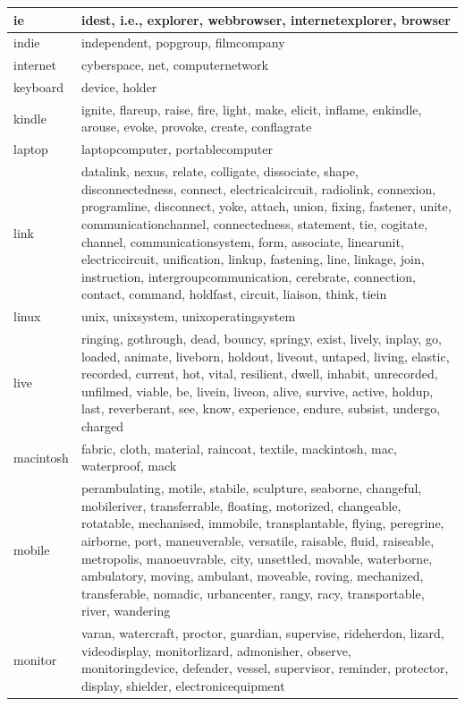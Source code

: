 \documentclass[12pt,a4paper]{report}
\begin{document}
\begin{table}[H]
\begin{center}
\begin{tabular}{|l|l|}
ie & idest, i.e., explorer, webbrowser, internetexplorer, browser\\
\hline
indie & independent, popgroup, filmcompany\\
\hline
internet & cyberspace, net, computernetwork\\
\hline
keyboard & device, holder\\
\hline
kindle & ignite, flareup, raise, fire, light, make, elicit, inflame, enkindle, arouse, evoke, provoke, create, conflagrate\\
\hline
laptop & laptopcomputer, portablecomputer\\
\hline
link & datalink, nexus, relate, colligate, dissociate, shape, disconnectedness, connect, electricalcircuit, radiolink, connexion, programline, disconnect, yoke, attach, union, fixing, fastener, unite, communicationchannel, connectedness, statement, tie, cogitate, channel, communicationsystem, form, associate, linearunit, electriccircuit, unification, linkup, fastening, line, linkage, join, instruction, intergroupcommunication, cerebrate, connection, contact, command, holdfast, circuit, liaison, think, tiein\\
\hline
linux & unix, unixsystem, unixoperatingsystem\\
\hline
live & ringing, gothrough, dead, bouncy, springy, exist, lively, inplay, go, loaded, animate, liveborn, holdout, liveout, untaped, living, elastic, recorded, current, hot, vital, resilient, dwell, inhabit, unrecorded, unfilmed, viable, be, livein, liveon, alive, survive, active, holdup, last, reverberant, see, know, experience, endure, subsist, undergo, charged\\
\hline
macintosh & fabric, cloth, material, raincoat, textile, mackintosh, mac, waterproof, mack\\
\hline
mobile & perambulating, motile, stabile, sculpture, seaborne, changeful, mobileriver, transferrable, floating, motorized, changeable, rotatable, mechanised, immobile, transplantable, flying, peregrine, airborne, port, maneuverable, versatile, raisable, fluid, raiseable, metropolis, manoeuvrable, city, unsettled, movable, waterborne, ambulatory, moving, ambulant, moveable, roving, mechanized, transferable, nomadic, urbancenter, rangy, racy, transportable, river, wandering\\
\hline
monitor & varan, watercraft, proctor, guardian, supervise, rideherdon, lizard, videodisplay, monitorlizard, admonisher, observe, monitoringdevice, defender, vessel, supervisor, reminder, protector, display, shielder, electronicequipment\\

\end{tabular}
\end{center}
\end{table}
\end{document}
